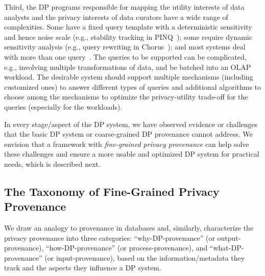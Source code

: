 Third, the DP programs responsible for mapping the utility interests of data analysts and the privacy interests of data curators have a wide range of complexities. Some have a fixed query template with a deterministic sensitivity and hence noise scale (e.g., stability tracking in PINQ~\cite{mcsherry2009pinq}); some require dynamic sensitivity analysis (e.g., query rewriting in Chorus~\cite{johnson2020chorus}); and most systems deal with more than one query~\cite{mcsherry2009pinq,johnson2020chorus,ge2019apex,ebadi2015differential}. The queries to be supported can be complicated, e.g., involving multiple transformations of data, and be batched into an OLAP workload.
The desirable system should support multiple mechanisms (including customized ones) to answer different types of queries and additional algorithms to choose among the mechanisms to optimize the privacy-utility trade-off for the queries (especially for the workloads).


In every stage/aspect of the DP system, we have observed evidence or challenges that the basic DP system or coarse-grained DP provenance cannot address.
We envision that a framework with \textit{fine-grained privacy provenance} can help solve these challenges and ensure a more usable and optimized DP system for practical needs, which is described next.


\subsection{The Taxonomy of Fine-Grained Privacy Provenance}

We draw an analogy to provenance in databases and, similarly, characterize the privacy provenance into three categories: ``why-DP-provenance'' (or output-provenance), ``how-DP-provenance'' (or process-provenance), and ``what-DP-provenance'' (or input-provenance), based on the information/metadata they track and the aspects they influence a DP system.

